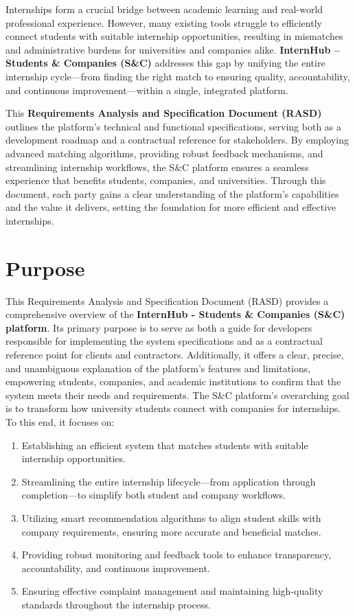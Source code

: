 Internships form a crucial bridge between academic learning and real-world professional experience. However, many existing tools struggle to efficiently connect students with suitable internship opportunities, resulting in mismatches and administrative burdens for universities and companies alike. \textbf{InternHub – Students \& Companies (S\&C)} addresses this gap by unifying the entire internship cycle—from finding the right match to ensuring quality, accountability, and continuous improvement—within a single, integrated platform.

This \textbf{Requirements Analysis and Specification Document (RASD)} outlines the platform’s technical and functional specifications, serving both as a development roadmap and a contractual reference for stakeholders. By employing advanced matching algorithms, providing robust feedback mechanisms, and streamlining internship workflows, the S\&C platform ensures a seamless experience that benefits students, companies, and universities. Through this document, each party gains a clear understanding of the platform’s capabilities and the value it delivers, setting the foundation for more efficient and effective internships.

\newpage

\section{Purpose}
\label{sec:purpose}%
This Requirements Analysis and Specification Document (RASD) provides a comprehensive overview of the \textbf{InternHub - Students \& Companies (S\&C) platform}. Its primary purpose is to serve as both a guide for developers responsible for implementing the system specifications and as a contractual reference point for clients and contractors. Additionally, it offers a clear, precise, and unambiguous explanation of the platform’s features and limitations, empowering students, companies, and academic institutions to confirm that the system meets their needs and requirements.
The S\&C platform’s overarching goal is to transform how university students connect with companies for internships. To this end, it focuses on:
\begin{enumerate}
    \item Establishing an efficient system that matches students with suitable internship opportunities.
    \item Streamlining the entire internship lifecycle—from application through completion—to simplify both student and company workflows. 
    \item Utilizing smart recommendation algorithms to align student skills with company requirements, ensuring more accurate and beneficial matches.
    \item Providing robust monitoring and feedback tools to enhance transparency, accountability, and continuous improvement.
    \item Ensuring effective complaint management and maintaining high-quality standards throughout the internship process.
\end{enumerate}

